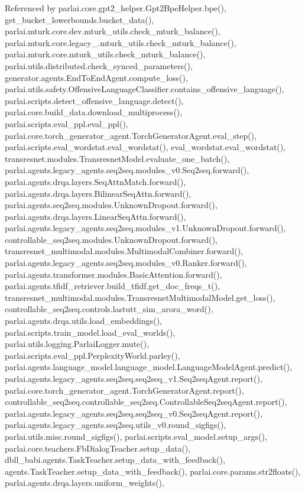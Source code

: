 Referenced by parlai.\+core.\+gpt2\+\_\+helper.\+Gpt2\+Bpe\+Helper.\+bpe(), get\+\_\+bucket\+\_\+lowerbounds.\+bucket\+\_\+data(), parlai.\+mturk.\+core.\+dev.\+mturk\+\_\+utils.\+check\+\_\+mturk\+\_\+balance(), parlai.\+mturk.\+core.\+legacy\+\_.\+mturk\+\_\+utils.\+check\+\_\+mturk\+\_\+balance(), parlai.\+mturk.\+core.\+mturk\+\_\+utils.\+check\+\_\+mturk\+\_\+balance(), parlai.\+utils.\+distributed.\+check\+\_\+synced\+\_\+parameters(), generator.\+agents.\+End\+To\+End\+Agent.\+compute\+\_\+loss(), parlai.\+utils.\+safety.\+Offensive\+Language\+Classifier.\+contains\+\_\+offensive\+\_\+language(), parlai.\+scripts.\+detect\+\_\+offensive\+\_\+language.\+detect(), parlai.\+core.\+build\+\_\+data.\+download\+\_\+multiprocess(), parlai.\+scripts.\+eval\+\_\+ppl.\+eval\+\_\+ppl(), parlai.\+core.\+torch\+\_\+generator\+\_\+agent.\+Torch\+Generator\+Agent.\+eval\+\_\+step(), parlai.\+scripts.\+eval\+\_\+wordstat.\+eval\+\_\+wordstat(), eval\+\_\+wordstat.\+eval\+\_\+wordstat(), transresnet.\+modules.\+Transresnet\+Model.\+evaluate\+\_\+one\+\_\+batch(), parlai.\+agents.\+legacy\+\_\+agents.\+seq2seq.\+modules\+\_\+v0.\+Seq2seq.\+forward(), parlai.\+agents.\+drqa.\+layers.\+Seq\+Attn\+Match.\+forward(), parlai.\+agents.\+drqa.\+layers.\+Bilinear\+Seq\+Attn.\+forward(), parlai.\+agents.\+seq2seq.\+modules.\+Unknown\+Dropout.\+forward(), parlai.\+agents.\+drqa.\+layers.\+Linear\+Seq\+Attn.\+forward(), parlai.\+agents.\+legacy\+\_\+agents.\+seq2seq.\+modules\+\_\+v1.\+Unknown\+Dropout.\+forward(), controllable\+\_\+seq2seq.\+modules.\+Unknown\+Dropout.\+forward(), transresnet\+\_\+multimodal.\+modules.\+Multimodal\+Combiner.\+forward(), parlai.\+agents.\+legacy\+\_\+agents.\+seq2seq.\+modules\+\_\+v0.\+Ranker.\+forward(), parlai.\+agents.\+transformer.\+modules.\+Basic\+Attention.\+forward(), parlai.\+agents.\+tfidf\+\_\+retriever.\+build\+\_\+tfidf.\+get\+\_\+doc\+\_\+freqs\+\_\+t(), transresnet\+\_\+multimodal.\+modules.\+Transresnet\+Multimodal\+Model.\+get\+\_\+loss(), controllable\+\_\+seq2seq.\+controls.\+lastutt\+\_\+sim\+\_\+arora\+\_\+word(), parlai.\+agents.\+drqa.\+utils.\+load\+\_\+embeddings(), parlai.\+scripts.\+train\+\_\+model.\+load\+\_\+eval\+\_\+worlds(), parlai.\+utils.\+logging.\+Parlai\+Logger.\+mute(), parlai.\+scripts.\+eval\+\_\+ppl.\+Perplexity\+World.\+parley(), parlai.\+agents.\+language\+\_\+model.\+language\+\_\+model.\+Language\+Model\+Agent.\+predict(), parlai.\+agents.\+legacy\+\_\+agents.\+seq2seq.\+seq2seq\+\_\+v1.\+Seq2seq\+Agent.\+report(), parlai.\+core.\+torch\+\_\+generator\+\_\+agent.\+Torch\+Generator\+Agent.\+report(), controllable\+\_\+seq2seq.\+controllable\+\_\+seq2seq.\+Controllable\+Seq2seq\+Agent.\+report(), parlai.\+agents.\+legacy\+\_\+agents.\+seq2seq.\+seq2seq\+\_\+v0.\+Seq2seq\+Agent.\+report(), parlai.\+agents.\+legacy\+\_\+agents.\+seq2seq.\+utils\+\_\+v0.\+round\+\_\+sigfigs(), parlai.\+utils.\+misc.\+round\+\_\+sigfigs(), parlai.\+scripts.\+eval\+\_\+model.\+setup\+\_\+args(), parlai.\+core.\+teachers.\+Fb\+Dialog\+Teacher.\+setup\+\_\+data(), dbll\+\_\+babi.\+agents.\+Task\+Teacher.\+setup\+\_\+data\+\_\+with\+\_\+feedback(), agents.\+Task\+Teacher.\+setup\+\_\+data\+\_\+with\+\_\+feedback(), parlai.\+core.\+params.\+str2floats(), parlai.\+agents.\+drqa.\+layers.\+uniform\+\_\+weights(), 